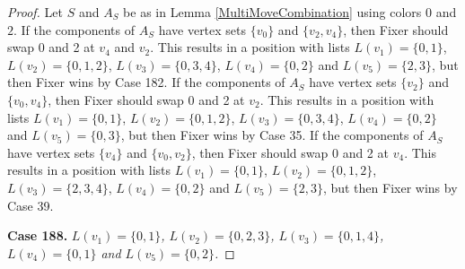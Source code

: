 \documentclass[12pt]{amsart}
\theoremstyle{plain}
\theoremstyle{definition}
\theoremstyle{remark}
\begin{document}
\begin{proof}
Let $S$ and $A_S$ be as in Lemma \ref{MultiMoveCombination} using colors $0$ and $2$. If the components of $A_S$ have vertex sets $\{v_0\}$ and $\{v_2, v_4\}$, then Fixer should swap 0 and 2 at $v_4$ and $v_2$. This results in a position with lists $L(v_1) = \{0, 1\}$, $L(v_2) = \{0, 1, 2\}$, $L(v_3) = \{0, 3, 4\}$, $L(v_4) = \{0, 2\}$ and $L(v_5) = \{2, 3\}$, but then Fixer wins by Case 182.
If the components of $A_S$ have vertex sets $\{v_2\}$ and $\{v_0, v_4\}$, then Fixer should swap 0 and 2 at $v_2$. This results in a position with lists $L(v_1) = \{0, 1\}$, $L(v_2) = \{0, 1, 2\}$, $L(v_3) = \{0, 3, 4\}$, $L(v_4) = \{0, 2\}$ and $L(v_5) = \{0, 3\}$, but then Fixer wins by Case 35.
If the components of $A_S$ have vertex sets $\{v_4\}$ and $\{v_0, v_2\}$, then Fixer should swap 0 and 2 at $v_4$. This results in a position with lists $L(v_1) = \{0, 1\}$, $L(v_2) = \{0, 1, 2\}$, $L(v_3) = \{2, 3, 4\}$, $L(v_4) = \{0, 2\}$ and $L(v_5) = \{2, 3\}$, but then Fixer wins by Case 39.

\noindent\textbf{Case 188.  }\textit{$L(v_1) = \{0, 1\}$, $L(v_2) = \{0, 2, 3\}$, $L(v_3) = \{0, 1, 4\}$, $L(v_4) = \{0, 1\}$ and $L(v_5) = \{0, 2\}$.}


\end{proof}
\end{document}
